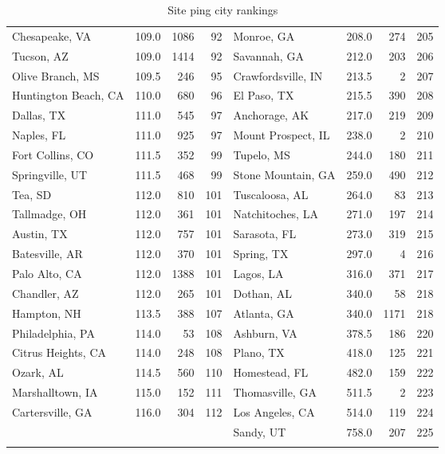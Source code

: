 \begin{longtable}{lrrr|lrrr}
Chesapeake, VA       &   109.0 &   1086 &    92 & Monroe, GA           &   208.0 &    274 &   205 \\
Tucson, AZ           &   109.0 &   1414 &    92 & Savannah, GA         &   212.0 &    203 &   206 \\
Olive Branch, MS     &   109.5 &    246 &    95 & Crawfordsville, IN   &   213.5 &      2 &   207 \\
Huntington Beach, CA &   110.0 &    680 &    96 & El Paso, TX          &   215.5 &    390 &   208 \\
Dallas, TX           &   111.0 &    545 &    97 & Anchorage, AK        &   217.0 &    219 &   209 \\
Naples, FL           &   111.0 &    925 &    97 & Mount Prospect, IL   &   238.0 &      2 &   210 \\
Fort Collins, CO     &   111.5 &    352 &    99 & Tupelo, MS           &   244.0 &    180 &   211 \\
Springville, UT      &   111.5 &    468 &    99 & Stone Mountain, GA   &   259.0 &    490 &   212 \\
Tea, SD              &   112.0 &    810 &   101 & Tuscaloosa, AL       &   264.0 &     83 &   213 \\
Tallmadge, OH        &   112.0 &    361 &   101 & Natchitoches, LA     &   271.0 &    197 &   214 \\
Austin, TX           &   112.0 &    757 &   101 & Sarasota, FL         &   273.0 &    319 &   215 \\
Batesville, AR       &   112.0 &    370 &   101 & Spring, TX           &   297.0 &      4 &   216 \\
Palo Alto, CA        &   112.0 &   1388 &   101 & Lagos, LA            &   316.0 &    371 &   217 \\
Chandler, AZ         &   112.0 &    265 &   101 & Dothan, AL           &   340.0 &     58 &   218 \\
Hampton, NH          &   113.5 &    388 &   107 & Atlanta, GA          &   340.0 &   1171 &   218 \\
Philadelphia, PA     &   114.0 &     53 &   108 & Ashburn, VA          &   378.5 &    186 &   220 \\
Citrus Heights, CA   &   114.0 &    248 &   108 & Plano, TX            &   418.0 &    125 &   221 \\
Ozark, AL            &   114.5 &    560 &   110 & Homestead, FL        &   482.0 &    159 &   222 \\
Marshalltown, IA     &   115.0 &    152 &   111 & Thomasville, GA      &   511.5 &      2 &   223 \\
Cartersville, GA     &   116.0 &    304 &   112 & Los Angeles, CA      &   514.0 &    119 &   224 \\
                     &         &        &       & Sandy, UT           &  758.0 &   207 &  225 \\
        \caption{Site ping city rankings}
        \label{tab:site_ping_city_rankings}
\end{longtable}

